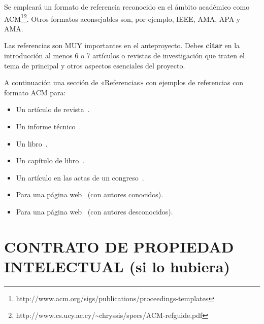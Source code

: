 \documentclass{pre-tfg}
\begin{document}
Se empleará un formato de referencia reconocido en el ámbito académico como
ACM\footnote{http://www.acm.org/sigs/publications/proceedings-templates}\footnote{http://www.cs.ucy.ac.cy/\~{}chryssis/specs/ACM-refguide.pdf}.
Otros formatos aconsejables son, por ejemplo, IEEE, AMA, APA y AMA.

Las referencias son MUY importantes en el anteproyecto. Debes \textbf{citar} en la
introducción al menos 6 o 7 artículos o revistas de investigación que traten el tema de
principal y otros aspectos esenciales del proyecto.


A continuación una sección de «Referencias» con ejemplos de referencias con formato ACM para:

\begin{itemize}
\item Un artículo de revista~\cite{Bow93}.
\item Un informe técnico~\cite{Ding97}.
\item Un libro~\cite{Tavel07}.
\item Un capítulo de libro~\cite{Greiner99}.
\item Un artículo en las actas de un congreso~\cite{Frohlic00}.
\item Para una página web~\cite{Steele04} (con autores conocidos).
\item Para una página web~\cite{Oxygen} (con autores desconocidos).
\end{itemize}



\singlespacing


\section{CONTRATO DE PROPIEDAD INTELECTUAL (si lo hubiera)}
  
\end{document}
